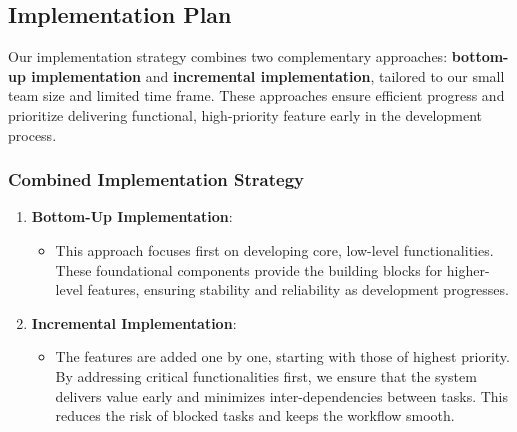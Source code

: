 


\subsection{Implementation Plan}
Our implementation strategy combines two complementary approaches: \textbf{bottom-up implementation} and \textbf{incremental implementation}, tailored to our small team size and limited time frame. These approaches ensure efficient progress and prioritize delivering functional, high-priority feature early in the development process.

    \subsubsection{Combined Implementation Strategy}
    \begin{enumerate}
        \item \textbf{Bottom-Up Implementation}: 
        \begin{itemize}
            \item This approach focuses first on developing core, low-level functionalities. These foundational components provide the building blocks for higher-level features, ensuring stability and reliability as development progresses. 
        \end{itemize}
        \item \textbf{Incremental Implementation}:
        \begin{itemize}
            \item The features are added one by one, starting with those of highest priority. By addressing critical functionalities first, we ensure that the system delivers value early and minimizes inter-dependencies between tasks. This reduces the risk of blocked tasks and keeps the workflow smooth.
        \end{itemize}
    \end{enumerate}

